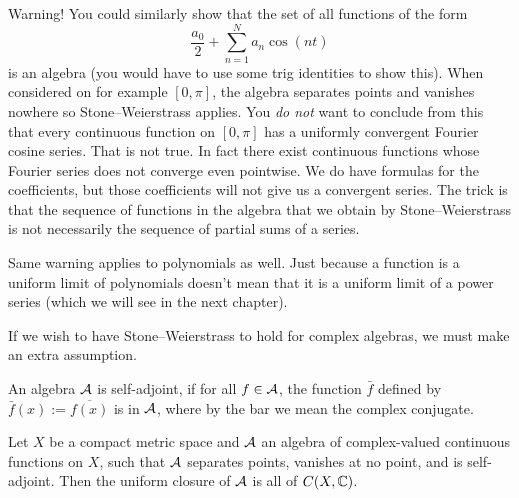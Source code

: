 Warning!
You could similarly show that the set of all functions of the form
\begin{equation*}
\frac{a_0}{2} +
\sum_{n=1}^N a_n \cos(nt)
\end{equation*}
is an algebra (you would have to use some trig identities to show this).
When considered on for example $[0,\pi]$, the
algebra separates points and vanishes nowhere so Stone--Weierstrass applies.
You \emph{do not} want to conclude from this that every continuous
function on $[0,\pi]$ has a uniformly convergent
Fourier cosine series.  That is not true.
In fact there exist continuous functions
whose Fourier series does not converge even pointwise.  We do have formulas
for the coefficients, but those coefficients will not give us a convergent
series.  The
trick is that the sequence of functions in the algebra that we obtain
by Stone--Weierstrass
is not necessarily the sequence of partial sums of a series.

Same warning applies to polynomials as well.  Just because a function is a
uniform limit of polynomials doesn't mean that it is a uniform limit of a
power series (which we will see in the next chapter).  

If we wish to have Stone--Weierstrass to hold for complex algebras, we must
make an extra assumption.

\begin{defn}
An algebra ${\mathcal{A}}$ is self-adjoint, if for all $f \in {\mathcal{A}}$, the function
$\bar{f}$ defined by $\bar{f}(x) := \overline{f(x)}$ is in ${\mathcal{A}}$, where by the
bar we mean the complex conjugate.
\end{defn}

\begin{thm}
Let $X$ be a compact metric space and ${\mathcal{A}}$ an algebra of complex-valued
continuous functions on $X$, such that ${\mathcal{A}}$ separates points, vanishes at
no point, and is self-adjoint.  Then the uniform closure of ${\mathcal{A}}$ is all of
$C(X,{\mathbb{C}})$.
\end{thm}

